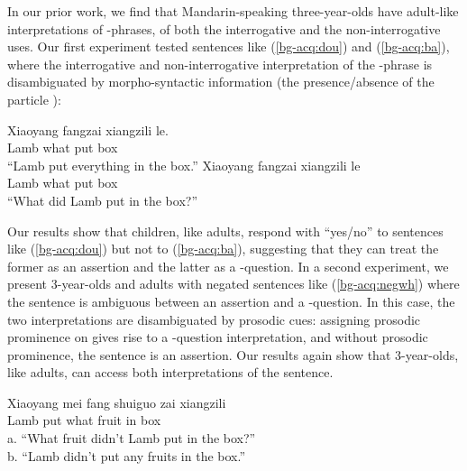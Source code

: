 In our prior work, we find that Mandarin-speaking three-year-olds have adult-like interpretations of \twh-phrases, of both the interrogative and the non-interrogative uses. Our first experiment tested sentences like (\ref{bg-acq:dou}) and (\ref{bg-acq:ba}), where the interrogative and non-interrogative interpretation of the \twh-phrase is disambiguated by morpho-syntactic information (the presence/absence of the particle \dou{}):

	
\gll Xiaoyang 	 	 	fangzai 	xiangzili 	le.\\
Lamb	what	\Dou{}	put 	box		\Asp{}\\
``Lamb put everything in the box.''
\eex
{}
\gll Xiaoyang	  	fangzai 	xiangzili 	le\\
	Lamb		what	put	box		\Asp{}\\
	``What did Lamb put in the box?''
\eex


Our results show that children, like adults, respond with “yes/no” to sentences like (\ref{bg-acq:dou}) but not to (\ref{bg-acq:ba}), suggesting that they can treat the former as an assertion and the latter as a \twh-question. In a second experiment, we present 3-year-olds and adults with negated sentences like (\ref{bg-acq:negwh}) where the sentence is ambiguous between an assertion and a \twh-question. In this case, the two interpretations are disambiguated by prosodic cues: assigning prosodic prominence on  gives rise to a \twh-question interpretation, and without prosodic prominence, the sentence is an assertion. Our results again show that 3-year-olds, like adults, can access both interpretations of the sentence.


\gll Xiaoyang mei	fang	 shuiguo zai	xiangzili\\
Lamb \Neg{}	put	what		fruit		in	box\\
a. ``What fruit didn't Lamb put in the box?''\\
b.	``Lamb didn't put any fruits in the box.''
\eex


